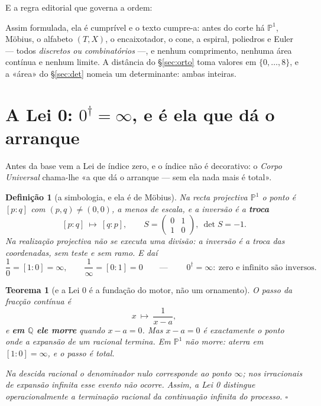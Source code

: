 \documentclass[11pt,a4paper]{article}
\newtheorem{teorema}{Teorema}
\newtheorem{definicao}{Definição}
\newcommand{\dg}{^{\dagger}}
\begin{document}
\medskip
\noindent E a regra editorial que governa a ordem:
\begin{center}
\end{center}
Assim formulada, ela é cumprível e o texto cumpre-a: antes do corte há
$\mathbb{P}^1$, Möbius, o alfabeto $(T,X)$, o encaixotador, o cone, a espiral,
poliedros e Euler --- todos \emph{discretos ou combinatórios} ---, e nenhum
comprimento, nenhuma área contínua e nenhum limite. A distância do
\S\ref{sec:orto} toma valores em $\{0,\ldots,8\}$, e a «área» do
\S\ref{sec:det} nomeia um determinante: ambas inteiras.

\section{A Lei 0: $0\dg=\infty$, e é ela que dá o arranque}\label{sec:lei0}

Antes da base vem a Lei de índice zero, e o índice não é decorativo: o
\emph{Corpo Universal} chama-lhe «a que dá o arranque --- sem ela nada mais é
total».

\begin{definicao}[a simbologia, e ela é de Möbius]\label{def:lei0}
Na recta projectiva $\mathbb{P}^1$ o ponto é $[p:q]$ com $(p,q)\neq(0,0)$, a menos
de escala, e a inversão é a \textbf{troca}
\[
\boxed{\;[p:q]\ \longmapsto\ [q:p],
\qquad S=\begin{pmatrix}0&1\\1&0\end{pmatrix},\ \det S=-1 .\;}
\]
\emph{Na realização projectiva não se executa uma divisão}: a inversão é a troca
das coordenadas, sem teste e sem ramo. E daí
\[
\frac10=[1:0]=\infty,
\qquad
\frac1\infty=[0:1]=0
\qquad\text{---}\qquad
\boxed{\;0\dg=\infty:\ \text{zero e infinito são inversos.}\;}
\]
\end{definicao}

\begin{teorema}[e a Lei 0 é a fundação do motor, não um ornamento]\label{thm:lei0}
O passo da fracção contínua é
\[
x\ \longmapsto\ \frac{1}{x-a},
\]
e \textbf{em $\mathbb{Q}$ ele morre} quando $x-a=0$. Mas $x-a=0$ é
\emph{exactamente} o ponto onde a expansão de um racional termina. Em
$\mathbb{P}^1$ não morre: aterra em $[1:0]=\infty$, e o passo é total.

Na descida racional o denominador nulo corresponde ao ponto $\infty$; nos
irracionais de expansão infinita esse evento não ocorre. \emph{Assim, a Lei 0
distingue operacionalmente a terminação racional da continuação infinita do
processo.} $\square$
\end{teorema}
\end{document}
